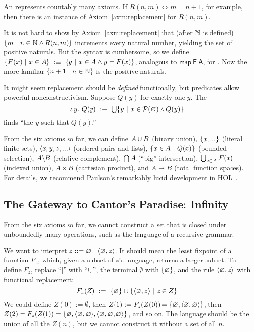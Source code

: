 An  represents countably many axioms. If $R(n,m) \iff m = n+1$, for example, then there is an instance of Axiom~\ref{axm:replacement} for $R(n,m)$.

It is not hard to show by Axiom~\ref{axm:replacement} that (after $\mathbb{N}$ is defined) $\lbrace {m} \ \lvert\ {n \in \mathbb{N} \wedge R(n,m)} \rbrace$ increments every natural number, yielding the set of positive naturals. But the syntax is cumbersome, so we define $\lbrace {F(x)} \ \lvert\ {x \in A} \rbrace\ :\equiv\ \lbrace {y} \ \lvert\ {x \in A \wedge y = F(x)} \rbrace$, analogous to $\mathsf{map~F~A}$, for . Now the more familiar $\lbrace {n + 1} \ \lvert\ {n \in \mathbb{N}} \rbrace$ is the positive naturals.

It might seem replacement should be \emph{defined} functionally, but predicates allow powerful nonconstructivism.
Suppose $Q(y)$ for exactly one $y$.
The 
\begin{equation}
	\iota\,{y}\ldotp\, Q(y)\ :\equiv\ \textstyle\bigcup \lbrace {y} \ \lvert\ {x \in \mathcal{P}(\varnothing) \wedge Q(y)} \rbrace
\end{equation}
finds ``the $y$ such that $Q(y)$.''

From the six axioms so far, we can define $A \cup B$ (binary union), $\{{x,...}\}$ (literal finite sets), $\langle{x,y,z,...}\rangle$ (ordered pairs and lists), $\lbrace {x \in A} \ \lvert\ {Q(x)} \rbrace$ (bounded selection), $A \backslash B$ (relative complement), $\textstyle\bigcap A$ (``big'' intersection), $\textstyle\bigcup_{x \in A} F(x)$ (indexed union), $A \times B$ (cartesian product), and $A \to B$ (total function spaces).
For details, we recommend Paulson's remarkably lucid development in HOL~\cite{cit:paulson-1993-settheory-i}.

\subsection{The Gateway to Cantor's Paradise: Infinity}

From the six axioms so far, we cannot construct a set that is closed under unboundedly many operations, such as the language of a recursive grammar.
\begin{example}
We want to interpret $z ::= \emptyset \ |\ \pair{\emptyset,z}$. It should mean the least fixpoint of a function $F_z$, which, given a subset of $z$'s language, returns a larger subset. To define $F_z$, replace ``$|$'' with ``$\cup$'', the terminal $\emptyset$ with $\{{\varnothing}\}$, and the rule $\langle{\varnothing,z}\rangle$ with functional replacement:
\begin{equation}
	F_z(Z)\ \metadef\ \set{\emptyset} \u \setb{\pair{\emptyset,z}}{z \in Z}
\label{eqn:f-of-z}
\end{equation}
We could define $Z(0) := \emptyset$, then $Z(1) := F_z(Z(0)) = \{{\varnothing,\langle{\varnothing,\varnothing}\rangle}\} $, then $Z(2) = F_z(Z(1)) = \{{\varnothing, \langle{\varnothing,\varnothing}\rangle, \langle{\varnothing,\varnothing,\varnothing}\rangle}\}$, and so on. The language should be the union of all the $Z(n)$, but we cannot construct it without a set of all $n$.
\exampleqed
\end{example}

